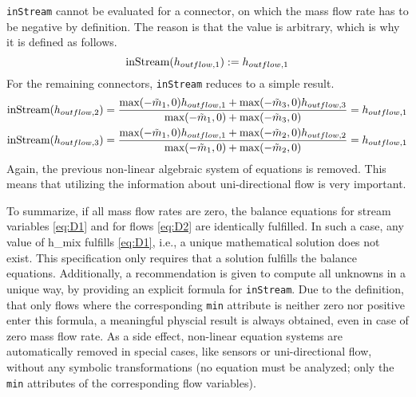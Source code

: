 \lstinline!inStream! cannot be evaluated for a connector, on which
the mass flow rate has to be negative by definition. The reason is that
the value is arbitrary, which is why it is defined as follows.
\begin{equation*}
\text{\lstinline!inStream!}(h_{outflow,1}):=h_{outflow,1}
\end{equation*}
For the remaining connectors, \lstinline!inStream! reduces to a simple result.
\begin{align*}
\text{\lstinline!inStream!}(h_{outflow,2}) &= \frac{\text{max}(-\tilde{m}_1,0)h_{outflow,1}+\text{max}(-\tilde{m}_3,0)h_{outflow,3}}{\text{max}(-\tilde{m}_1,0)+\text{max}(-\tilde{m}_3,0)}
  = h_{outflow,1}\\
\text{\lstinline!inStream!}(h_{outflow,3}) &= \frac{\text{max}(-\tilde{m}_1,0)h_{outflow,1}+\text{max}(-\tilde{m}_2,0)h_{outflow,2}}{\text{max}(-\tilde{m}_1,0)+\text{max}(-\tilde{m}_2,0)}
  = h_{outflow,1}
\end{align*}
Again, the previous non-linear algebraic system of equations is removed.
This means that utilizing the information about uni-directional flow is
very important.

To summarize, if all mass flow rates are zero, the balance equations for
stream variables \eqref{eq:D1} and for flows \eqref{eq:D2} are identically fulfilled. In
such a case, any value of h\_mix fulfills \eqref{eq:D1}, i.e., a unique
mathematical solution does not exist. This specification only requires
that a solution fulfills the balance equations. Additionally, a
recommendation is given to compute all unknowns in a unique way, by
providing an explicit formula for \lstinline!inStream!. Due to the
definition, that only flows where the corresponding \lstinline!min! attribute is
neither zero nor positive enter this formula, a meaningful physcial
result is always obtained, even in case of zero mass flow rate. As a
side effect, non-linear equation systems are automatically removed in
special cases, like sensors or uni-directional flow, without any
symbolic transformations (no equation must be analyzed; only the
\lstinline!min! attributes of the corresponding flow variables).
